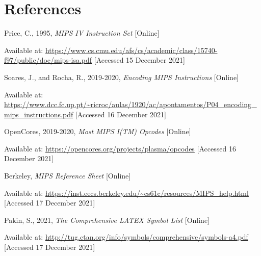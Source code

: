 \documentclass{article}
\begin{document}
\section{References}

Price, C., 1995,  \emph{MIPS IV Instruction Set} [Online]

Available at: \url{https://www.cs.cmu.edu/afs/cs/academic/class/15740-f97/public/doc/mips-isa.pdf} [Accessed 15 December 2021]

Soares, J., and Rocha, R., 2019-2020,  \emph{Encoding MIPS Instructions} [Online]

Available at: \url{https://www.dcc.fc.up.pt/~ricroc/aulas/1920/ac/apontamentos/P04_encoding_mips_instructions.pdf} [Accessed 16 December 2021]

OpenCores, 2019-2020,  \emph{Most MIPS I(TM) Opcodes} [Online]

Available at: \url{https://opencores.org/projects/plasma/opcodes} [Accessed 16 December 2021]

Berkeley, \emph{MIPS Reference Sheet} [Online]

Available at: \url{https://inst.eecs.berkeley.edu/~cs61c/resources/MIPS_help.html} [Accessed 17 December 2021]

Pakin, S., 2021, \emph{The Comprehensive LATEX Symbol List} [Online]

Available at: \url{http://tug.ctan.org/info/symbols/comprehensive/symbols-a4.pdf} [Accessed 17 December 2021]
\end{document}
